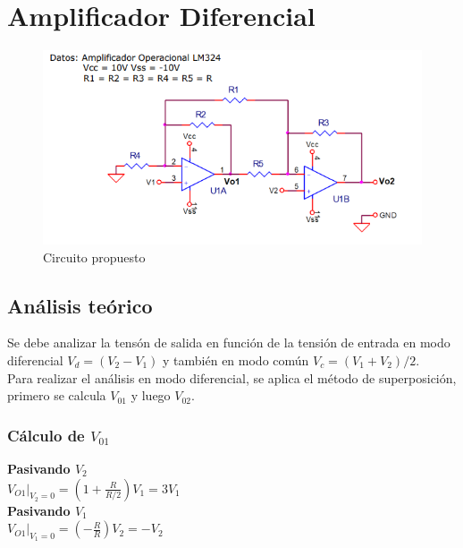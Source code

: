 \newpage
\section{Amplificador Diferencial}
\begin{figure}[htb]
	\centering
	\includegraphics[width=1\textwidth]{figuras/circuito_consigna.png}
	\caption{Circuito propuesto}
\end{figure}
\subsection{Análisis teórico}
Se debe analizar la tensón de salida en función de la tensión de entrada en modo diferencial $ V_d=(V_2-V_1)$ y también en modo común $V_c=(V_1+V_2)/2$.\\
Para realizar el análisis en modo diferencial, se aplica el método de superposición, primero se calcula $V_{01}$ y luego $V_{02}$.

\subsubsection{Cálculo de $V_{01}$}
\onehalfspacing
\begin{flushleft}
	\textbf{Pasivando $V_2$}\\
	$V_{O1}|_{V_2=0}=(1+\frac{R}{R/2})V_1=3V_1$ \\
	\textbf{Pasivando $V_1$} \\
	$V_{O1}|_{V_1=0}=(-\frac{R}{R})V_2=-V_2$ 
\end{flushleft}\begin{center}
\end{center}

